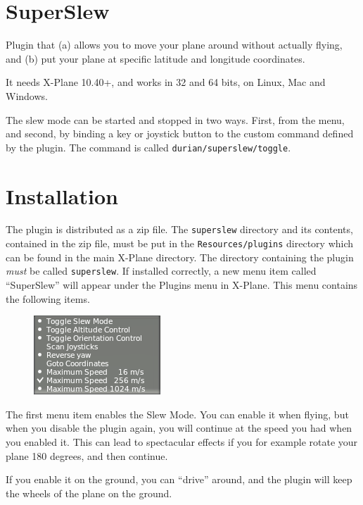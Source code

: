 \documentclass[a4paper,12pt]{article}
\begin{document}
\section*{SuperSlew}

Plugin that (a) allows you to move your plane around without actually
flying, and (b) put your plane at specific latitude and longitude coordinates.

\vspace{0.5\baselineskip}
It needs X-Plane 10.40+, and works in 32 and 64 bits, on Linux, Mac
and Windows.

\vspace{0.5\baselineskip}
The slew mode can be started and stopped in two ways. First, from the
menu, and second, by binding a key or joystick button to the custom command
defined by the plugin. The command is called
\texttt{durian/superslew/toggle}. 

\section*{Installation}

The plugin is distributed as a zip file. The \texttt{superslew}
directory and its contents, contained in the zip file, must be put in
the \texttt{Resources/plugins} directory which can be found in the
main X-Plane directory. The directory containing the plugin
\textsl{must} be called \texttt{superslew}. If installed correctly, a
new menu item called ``SuperSlew'' will appear under the Plugins menu
in X-Plane. This menu contains the following items. 

\begin{figure}[h!]%
\centering
\includegraphics[scale=1]{slewstandard.png}
\label{fig:infowindow}
\end{figure}

The first menu item enables the Slew Mode. You can enable it when
flying, but when you disable the plugin again, you will continue at
the speed you had when you enabled it. This can lead to spectacular
effects if you for example rotate your plane 180 degrees, and then
continue. 

If you enable it on the ground, you can ``drive'' around, and the
plugin will keep the wheels of the plane on the ground.
\end{document}
